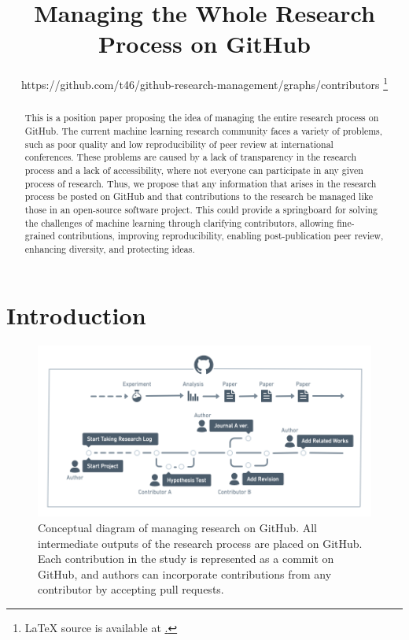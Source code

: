 \documentclass{article}
\title{Managing the Whole Research Process on GitHub}
\author{%
https://github.com/t46/github-research-management/graphs/contributors
\thanks{
  LaTeX source is available at 
  \href{https://github.com/t46/github-research-management}.
  }
}
\begin{document}
\maketitle


\begin{abstract}
  This is a position paper proposing the idea of managing the entire research process on GitHub. The current machine learning research community faces a variety of problems, such as poor quality and low reproducibility of peer review at international conferences. These problems are caused by a lack of transparency in the research process and a lack of accessibility, where not everyone can participate in any given process of research. Thus, we propose that any information that arises in the research process be posted on GitHub and that contributions to the research be managed like those in an open-source software project. This could provide a springboard for solving the challenges of machine learning through clarifying contributors, allowing fine-grained contributions, improving reproducibility, enabling post-publication peer review, enhancing diversity, and protecting ideas.
\end{abstract}


\section{Introduction}

\begin{figure}[htb]
    \centering
    \includegraphics[width=\linewidth]{figs/GitHubResearchManagement.png}
    \caption{Conceptual diagram of managing research on GitHub. All intermediate outputs of the research process are placed on GitHub. Each contribution in the study is represented as a commit on GitHub, and authors can incorporate contributions from any contributor by accepting pull requests.}
    \label{fig:conceptual_diagram}
\end{figure}
\end{document}
